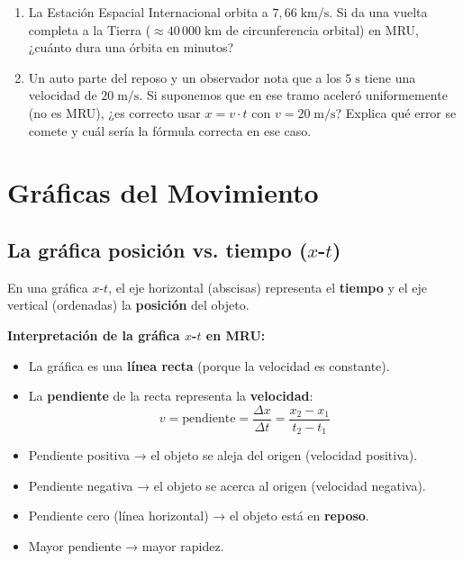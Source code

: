 \documentclass[12pt, a4paper]{article}
\begin{document}
\begin{enumerate}[leftmargin=*, resume]
  \item \dificil{} La Estación Espacial Internacional orbita a $7{,}66\;\text{km/s}$. Si da una vuelta completa a la Tierra ($\approx 40\,000\;\text{km}$ de circunferencia orbital) en MRU, ¿cuánto dura una órbita en minutos?

  \item \dificil{} Un auto parte del reposo y un observador nota que a los $5\;\text{s}$ tiene una velocidad de $20\;\text{m/s}$. Si suponemos que en ese tramo aceleró uniformemente (no es MRU), ¿es correcto usar $x = v \cdot t$ con $v = 20\;\text{m/s}$? Explica qué error se comete y cuál sería la fórmula correcta en ese caso.
\end{enumerate}

\newpage

\section{Gráficas del Movimiento}

\subsection{La gráfica posición vs. tiempo ($x$-$t$)}

En una gráfica $x$-$t$, el eje horizontal (abscisas) representa el \textbf{tiempo} y el eje vertical (ordenadas) la \textbf{posición} del objeto.

\begin{cuadroteoria}
\textbf{Interpretación de la gráfica $x$-$t$ en MRU:}
\begin{itemize}[leftmargin=*]
  \item La gráfica es una \textbf{línea recta} (porque la velocidad es constante).
  \item La \textbf{pendiente} de la recta representa la \textbf{velocidad}:
  $$v = \text{pendiente} = \frac{\Delta x}{\Delta t} = \frac{x_2 - x_1}{t_2 - t_1}$$
  \item Pendiente positiva → el objeto se aleja del origen (velocidad positiva).
  \item Pendiente negativa → el objeto se acerca al origen (velocidad negativa).
  \item Pendiente cero (línea horizontal) → el objeto está en \textbf{reposo}.
  \item Mayor pendiente → mayor rapidez.
\end{itemize}
\end{cuadroteoria}
\end{document}

